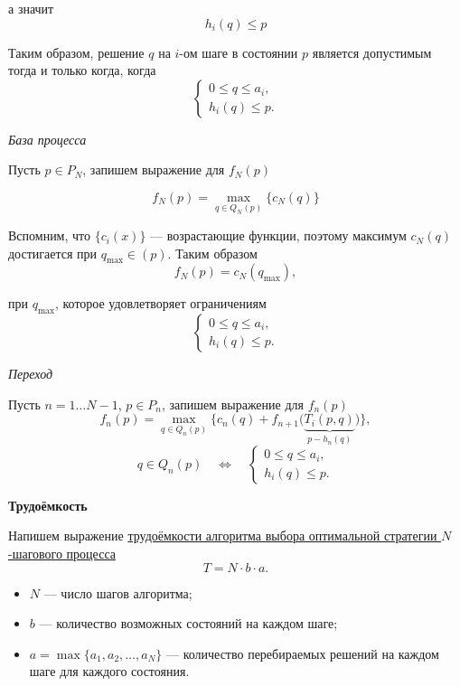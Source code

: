 а значит
\[
\boxed{h_i(q) \le p}
\]

Таким образом, решение $q$ на $i$-ом шаге в состоянии $p$ является допустимым тогда и только когда, когда
\[
\begin{cases}
	0 \le q \le a_i, \\
	h_i(q) \le p.
\end{cases}
\]

\bigskip

\textit{База процесса}

Пусть $p \in P_N$, запишем выражение для $f_N(p)$

\[
f_N(p) = \max_{q \in Q_N(p)} \{c_N(q)\}
\]

Вспомним, что $\{c_i(x)\}$ --- возрастающие функции, поэтому максимум $c_N(q)$ достигается при $q_{\max} \in (p)$. Таким образом
\[
f_N(p) = c_N(q_{\max}),
\]

при $q_{\max}$, которое удовлетворяет ограничениям
\[
\begin{cases}
	0 \le q \le a_i, \\
	h_i(q) \le p.
\end{cases}
\]

\bigskip

\textit{Переход}

Пусть $n = 1 \dots N-1$, $p \in P_n$, запишем выражение для $f_n(p)$
\[
f_n(p) = \max_{q \in Q_n(p)} \big\{c_n(q) + f_{n+1}\big(\underbrace{T_i(p, q)}_{p - h_n(q)}\big)\big\},
\]
\[
q \in Q_n(p) \quad \Longleftrightarrow \quad \begin{cases}
	0 \le q \le a_i, \\
	h_i(q) \le p.
\end{cases}
\]

\bigskip

\textbf{Трудоёмкость}

Напишем выражение \hyperref[n_step_complexity]{трудоёмкости алгоритма выбора оптимальной стратегии $N$-шагового процесса}
\[
T = N \cdot b \cdot a.
\]

\begin{itemize}[nosep]
	\item $N$ --- число шагов алгоритма;
	
	\item $b$ --- количество возможных состояний на каждом шаге;
	
	\item $a = \max\{a_1, a_2, \dots, a_N\}$ --- количество перебираемых решений на каждом шаге для каждого состояния.
\end{itemize}

